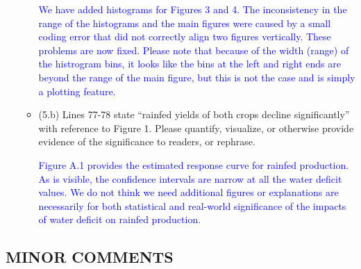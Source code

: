 \documentclass[
]{article}
\begin{document}
\begin{itemize}
\begin{itemize}
   \textcolor{blue}{We have added histograms for Figures 3 and 4. The inconsistency in the range of the histograms and the main figures were caused by a small coding error that did not correctly align two figures vertically. These problems are now fixed. Please note that because of the width (range) of the histrogram bins, it looks like the bins at the left and right ends are beyond the range of the main figure, but this is not the case and is simply a plotting feature.}

  \item (5.b) Lines 77-78 state ``rainfed yields of both crops decline significantly'' with reference to Figure 1. Please quantify, visualize, or otherwise provide evidence of the significance to readers, or rephrase.

  \textcolor{blue}{Figure A.1 provides the estimated response curve for rainfed production. As is visible, the confidence intervals are narrow at all the water deficit values. We do not think we need additional figures or explanations are necessarily for both statistical and real-world significance of the impacts of water deficit on rainfed production.}

  \end{itemize}

\end{itemize}

\subsection{MINOR COMMENTS}
\end{document}
